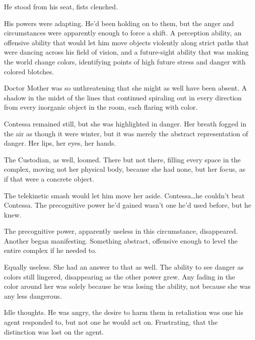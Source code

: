 He stood from his seat, fists clenched.



His powers were adapting.  He'd been holding on to them, but the anger and circumstances were apparently enough to force a shift.  A perception ability, an offensive ability that would let him move objects violently along strict paths that were dancing across his field of vision, and a future-sight ability that was making the world change colors, identifying points of high future stress and danger with colored blotches.



Doctor Mother was so unthreatening that she might as well have been absent.  A shadow in the midst of the lines that continued spiraling out in every direction from every inorganic object in the room, each flaring with color.



Contessa remained still, but she was highlighted in danger.  Her breath fogged in the air as though it were winter, but it was merely the abstract representation of danger.  Her lips, her eyes, her hands.



The Custodian, as well, loomed.  There but not there, filling every space in the complex, moving not her physical body, because she had none, but her focus, as if that were a concrete object.



The telekinetic smash would let him move her aside.  Contessa\ldots he couldn't beat Contessa.  The precognitive power he'd gained wasn't one he'd used before, but he knew.



The precognitive power, apparently useless in this circumstance, disappeared.  Another began manifesting.  Something abstract, offensive enough to level the entire complex if he needed to.



Equally useless.  She had an answer to that as well.  The ability to see danger as colors still lingered, disappearing as the other power grew.  Any fading in the color around her was solely because he was losing the ability, not because she was any less dangerous.



Idle thoughts.  He was angry, the desire to harm them in retaliation was one his agent responded to, but not one he would act on.  Frustrating, that the distinction was lost on the agent.



